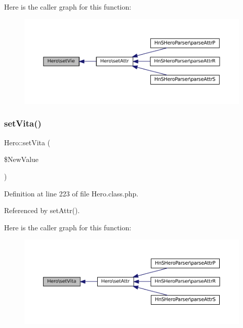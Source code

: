 Here is the caller graph for this function\+:\nopagebreak
\begin{figure}[H]
\begin{center}
\leavevmode
\includegraphics[width=350pt]{class_hero_a0f2eba73b403fad9079877dd64a08e65_icgraph}
\end{center}
\end{figure}
\mbox{\label{class_hero_aa83218c340bb49f69ee5d537974be752}} 
\subsubsection{\texorpdfstring{set\+Vita()}{setVita()}}
{\footnotesize\ttfamily Hero\+::set\+Vita (\begin{DoxyParamCaption}\item[{}]{\$\+New\+Value }\end{DoxyParamCaption})}



Definition at line 223 of file Hero.\+class.\+php.



Referenced by set\+Attr().

Here is the caller graph for this function\+:\nopagebreak
\begin{figure}[H]
\begin{center}
\leavevmode
\includegraphics[width=350pt]{class_hero_aa83218c340bb49f69ee5d537974be752_icgraph}
\end{center}
\end{figure}
\mbox{\label{class_hero_addb871db0a6ad4af6209a9d6b155ab79}} 
